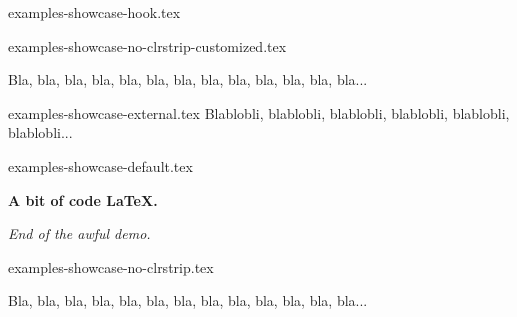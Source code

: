 \begin{filecontents*}[overwrite]{examples-showcase-hook.tex}
\begin{tdocshowcase}
\end{tdocshowcase}
\end{filecontents*}


\begin{filecontents*}[overwrite]{examples-showcase-no-clrstrip-customized.tex}
\begin{tdocshowcase}[nostripe,
                     before = My beginning,
                     after  = My end,
                     color  = green]
    Bla, bla, bla, bla, bla, bla, bla, bla, bla, bla, bla, bla, bla...
\end{tdocshowcase}
\end{filecontents*}


\begin{filecontents*}[overwrite]{examples-showcase-external.tex}
Blablobli, blablobli, blablobli, blablobli, blablobli, blablobli...
\end{filecontents*}


\begin{filecontents*}[overwrite]{examples-showcase-default.tex}
\begin{tdocshowcase}
    \bfseries A bit of code \LaTeX.

    \bigskip

    \emph{\large End of the awful demo.}
\end{tdocshowcase}
\end{filecontents*}


\begin{filecontents*}[overwrite]{examples-showcase-no-clrstrip.tex}
\begin{tdocshowcase}[nostripe]
    Bla, bla, bla, bla, bla, bla, bla, bla, bla, bla, bla, bla, bla...
\end{tdocshowcase}
\end{filecontents*}



\documentclass[10pt, a4paper]{article}

\usepackage[utf8]{inputenc}
\usepackage[T1]{fontenc}

\usepackage[english]{babel, varioref}

\usepackage{enumitem}

\usepackage{fmtcount}

\setlength{\parindent}{0em}

